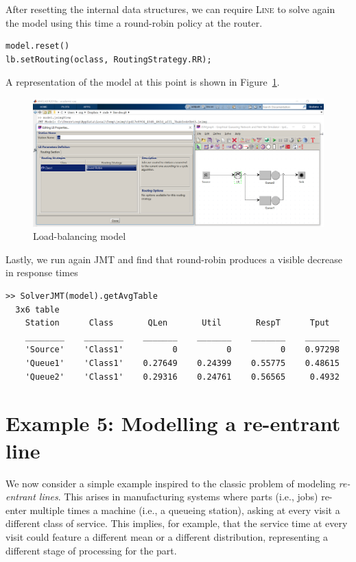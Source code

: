 After resetting the internal data structures, we can require \textsc{Line} to solve again the model using this time a round-robin policy at the router.
\begin{lstlisting}
model.reset()
lb.setRouting(oclass, RoutingStrategy.RR);
\end{lstlisting}
A representation of the model at this point is shown in Figure~\ref{FIG:jsimgViewLB}.
\begin{figure}[h!t]
  \centering
  \includegraphics[width=14cm]{./images/jsimgViewLB.png}
  \caption{Load-balancing model}\label{FIG:jsimgViewLB}
\end{figure}
Lastly, we run again JMT and find that round-robin produces a visible decrease in response times
\begin{lstlisting}
>> SolverJMT(model).getAvgTable
  3x6 table
    Station      Class       QLen       Util       RespT      Tput
    ________    ________    _______    _______    _______    _______
    'Source'    'Class1'          0          0          0    0.97298
    'Queue1'    'Class1'    0.27649    0.24399    0.55775    0.48615
    'Queue2'    'Class1'    0.29316    0.24761    0.56565     0.4932
\end{lstlisting}

\section{Example 5: Modelling a re-entrant line}
\label{example-5-modelling-a-re-entrant-line}
We now consider a simple example inspired to the classic problem of modeling {\em re-entrant lines}. This arises in manufacturing systems where parts (i.e., jobs) re-enter multiple times a machine (i.e., a queueing station), asking at every visit a different class of service. This implies, for example, that the service time at every visit could feature a different mean or a different distribution, representing a different stage of processing for the part.

